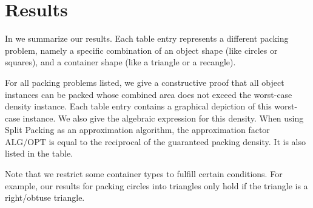 \documentclass[a4paper,style=print,oneside,bibliography=totoc,nexus,lnum,extramargin]{tubsbook}
\begin{document}


\section{Results}

In  we summarize our results. Each table entry represents a different packing problem, namely a specific combination of an object shape (like circles or squares), and a container shape (like a triangle or a recangle).

For all packing problems listed, we give a constructive proof that all object instances can be packed whose combined area does not exceed the worst-case density instance. Each table entry contains a graphical depiction of this worst-case instance. We also give the algebraic expression for this density.
When using Split Packing as an approximation algorithm, the approximation factor $\text{ALG}/\text{OPT}$ is equal to the reciprocal of the guaranteed packing density. It is also listed in the table.

Note that we restrict some container types to fulfill certain conditions. For example, our results for packing circles into triangles only hold if the triangle is a right/obtuse triangle.
\end{document}
